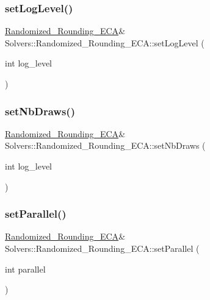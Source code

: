 \subsubsection{\texorpdfstring{set\+Log\+Level()}{setLogLevel()}}
{\footnotesize\ttfamily \hyperlink{class_solvers_1_1_randomized___rounding___e_c_a}{Randomized\+\_\+\+Rounding\+\_\+\+E\+CA}\& Solvers\+::\+Randomized\+\_\+\+Rounding\+\_\+\+E\+C\+A\+::set\+Log\+Level (\begin{DoxyParamCaption}\item[{int}]{log\+\_\+level }\end{DoxyParamCaption})\hspace{0.3cm}{\ttfamily [inline]}}

\mbox{\label{class_solvers_1_1_randomized___rounding___e_c_a_aba0b81a8be1a129086420decd51df069}} 
\subsubsection{\texorpdfstring{set\+Nb\+Draws()}{setNbDraws()}}
{\footnotesize\ttfamily \hyperlink{class_solvers_1_1_randomized___rounding___e_c_a}{Randomized\+\_\+\+Rounding\+\_\+\+E\+CA}\& Solvers\+::\+Randomized\+\_\+\+Rounding\+\_\+\+E\+C\+A\+::set\+Nb\+Draws (\begin{DoxyParamCaption}\item[{int}]{log\+\_\+level }\end{DoxyParamCaption})\hspace{0.3cm}{\ttfamily [inline]}}

\mbox{\label{class_solvers_1_1_randomized___rounding___e_c_a_a66ac903b915fcc755c1dd4b0f54ed6ec}} 
\subsubsection{\texorpdfstring{set\+Parallel()}{setParallel()}}
{\footnotesize\ttfamily \hyperlink{class_solvers_1_1_randomized___rounding___e_c_a}{Randomized\+\_\+\+Rounding\+\_\+\+E\+CA}\& Solvers\+::\+Randomized\+\_\+\+Rounding\+\_\+\+E\+C\+A\+::set\+Parallel (\begin{DoxyParamCaption}\item[{int}]{parallel }\end{DoxyParamCaption})\hspace{0.3cm}{\ttfamily [inline]}}

